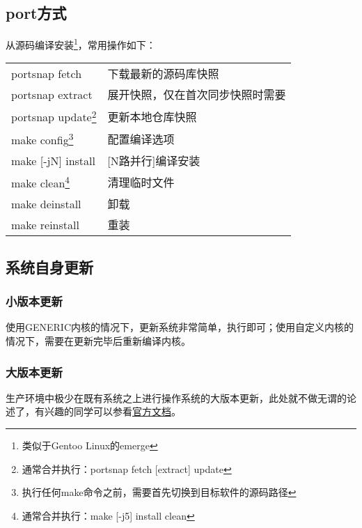\subsection{port方式}
从源码编译安装\footnote{类似于Gentoo Linux的emerge}，常用操作如下：

\vspace{1ex}
\begin{minipage}{\textwidth}
    \small
    \begin{tabular}{|l|l|}
        \hline
        portsnap fetch&下载最新的源码库快照\\
        portsnap extract&展开快照，仅在首次同步快照时需要\\
        portsnap update\footnote{通常合并执行：portsnap fetch [extract] update}&更新本地仓库快照\\
        make config\footnote{执行任何make命令之前，需要首先切换到目标软件的源码路径}&配置编译选项\\
        make [-jN] install&[N路并行]编译安装\\
        make clean\footnote{通常合并执行：make [-j5] install clean}&清理临时文件\\
        make deinstall&卸载\\
        make reinstall&重装\\
        \hline
    \end{tabular}
\end{minipage}

\subsection{系统自身更新}

\subsubsection{小版本更新}
使用GENERIC内核的情况下，更新系统非常简单，执行即可；使用自定义内核的情况下，需要在更新完毕后重新编译内核。

\subsubsection{大版本更新}
生产环境中极少在既有系统之上进行操作系统的大版本更新，此处就不做无谓的论述了，有兴趣的同学可以参看\href{https://www.freebsd.org/doc/en_US.ISO8859-1/books/handbook/updating-upgrading.html}{官方文档}。
